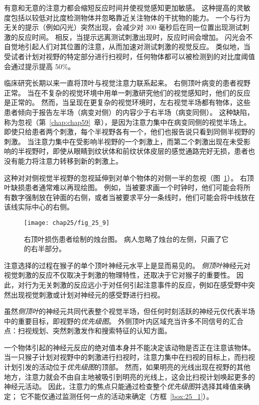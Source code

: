 有意和无意的注意力都会缩短反应时间并使视觉感知更加敏感。
这种提高的灵敏度包括以较低对比度检测物体并忽略靠近关注物体的干扰物的能力。
一个与行为无关的提示（例如闪光）突然出现，会减少对 300 毫秒后在同一位置出现测试刺激的反应时间。
相反，当提示远离测试刺激出现时，反应时间会增加。
闪光会不自觉地引起人们对其位置的注意，从而加速对测试刺激的视觉反应。
类似地，当受试者计划对视野的特定部分进行扫视时，任何物体都可以被检测到的对比度阈值会通过提示提高 50\%。


临床研究长期以来一直将顶叶与视觉注意力联系起来。
右侧顶叶病变的患者视野正常。
当在不复杂的视觉环境中用单一刺激研究他们的视觉感知时，他们的反应是正常的。
然而，当呈现在更复杂的视觉环境时，左右视觉半场都有物体，这些患者倾向于报告左半场（病变对侧）的内容少于右半场（病变同侧）。
这种缺陷，称为忽视（第~\ref{chap:chap59}~章），是因为注意力集中在病变同侧的视觉半场上。
即使只给患者两个刺激，每个半视野各有一个，他们也报告说只看到同侧半视野的刺激。
当注意力集中在受影响半视野的一个刺激上，而第二个刺激出现在未受影响的半视野时，即使从眼睛到纹状体和前纹状体皮层的感觉通路完好无损，患者也没有能力将注意力转移到新的刺激上。


这种对对侧视觉半视野的忽视延伸到对单个物体的对侧一半的忽视（图~\ref{fig:25_9}）。
右顶叶缺损患者通常难以再现绘图。
例如，当被要求画一个时钟时，他们可能会将所有数字强制放在钟面的右侧，或者当被要求平分一条线时，他们可能会将中线放在该线实际中心的右侧。


\begin{figure}[htbp]
	\centering
	\texttt{[image: chap25/fig\_25\_9]}
	\caption{右顶叶损伤患者绘制的烛台图。
		病人忽略了烛台的左侧，只画了它的右半部分。}
	\label{fig:25_9}
\end{figure}


注意选择的过程在猴子的单个顶叶神经元水平上是显而易见的。
\textit{侧顶叶}神经元对视觉刺激的反应不仅取决于刺激的物理特性，还取决于它对猴子的重要性。
因此，对行为无关刺激的反应远小于对任何引起注意事件的反应，例如在感受野中突然出现视觉刺激或计划对神经元的感受野进行扫视。


虽然\textit{侧顶叶}的神经元共同代表整个视觉半场，但任何时刻活跃的神经元仅代表半场中的重要目标，即视野的\textit{优先级图}。
外侧顶叶内区域充当许多不同信号的汇合点：扫视规划、突然刺激发作和搜索特征的认知方面。


一个物体引起的神经元反应的绝对值本身并不能决定该动物是否正在注意该物体。
当一只猴子计划对视野中的刺激进行扫视时，注意力集中在扫视的目标上，而扫视计划引发的活动位于\textit{优先级图}的顶部。
然而，如果明亮的光线出现在视野的其他地方，注意力就会不由自主地被吸引到明亮的光线上，这会比扫视计划唤起更多的神经元活动。
因此，注意力的焦点只能通过检查整个\textit{优先级图}并选择其峰值来确定；
它不能仅通过监测任何一点的活动来确定（方框~\ref{box:25_1}）。


